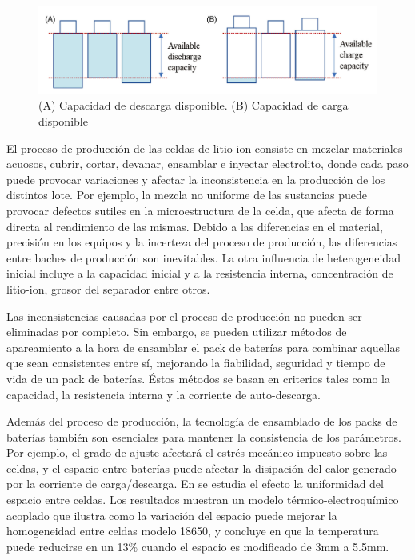 \documentclass[10pt,a4paper]{article}
\newcounter{subsubsubsection}[subsubsection]
\begin{document}
\begin{figure}[h!]
    \begin{center}
        \includegraphics[width=1\textwidth]{barrel_effect.png}
        \caption{(A) Capacidad de descarga disponible. (B) Capacidad de carga
        disponible}
        \label{barrel_effect}
    \end{center}
\end{figure}


El proceso de producci\'on de las celdas de litio-ion consiste en mezclar
materiales acuosos, cubrir, cortar, devanar, ensamblar e inyectar electrolito,
donde cada paso puede provocar variaciones y afectar la inconsistencia en la
producci\'on de los distintos lote. Por ejemplo, la mezcla no uniforme de las
sustancias puede provocar defectos sutiles en la microestructura de la celda,
que afecta de forma directa al rendimiento de las mismas. Debido a las
diferencias en el material, precisi\'on en los equipos y la incerteza del
proceso de producci\'on, las diferencias entre baches de producci\'on son
inevitables. La otra influencia de heterogeneidad inicial incluye a la capacidad
inicial y a la resistencia interna, concentraci\'on de litio-ion, grosor del
separador entre otros.

Las inconsistencias causadas por el proceso de producci\'on no pueden ser
eliminadas por completo. Sin embargo, se pueden utilizar m\'etodos de
apareamiento a la hora de ensamblar el pack de bater\'ias para combinar aquellas
que sean consistentes entre s\'i, mejorando la fiabilidad, seguridad y tiempo de
vida de un pack de bater\'ias. \'Estos m\'etodos se basan en criterios tales
como la capacidad, la resistencia interna y la corriente de auto-descarga.


Adem\'as del proceso de producci\'on, la tecnolog\'ia de ensamblado de los
packs de bater\'ias tambi\'en son esenciales para mantener la consistencia de
los par\'ametros. Por ejemplo, el grado de ajuste afectar\'a el estr\'es
mec\'anico impuesto sobre las celdas, y el espacio entre bater\'ias puede
afectar la disipaci\'on del calor generado por la corriente de carga/descarga.
En \cite{JI2019113683} se estudia el efecto la uniformidad del espacio entre 
celdas. Los resultados muestran un modelo t\'ermico-electroqu\'imico acoplado que 
ilustra como la variaci\'on del espacio puede mejorar la homogeneidad entre 
celdas modelo 18650, y concluye en que la temperatura puede reducirse en un 13\% 
cuando el espacio es modificado de 3mm a 5.5mm.
\end{document}
